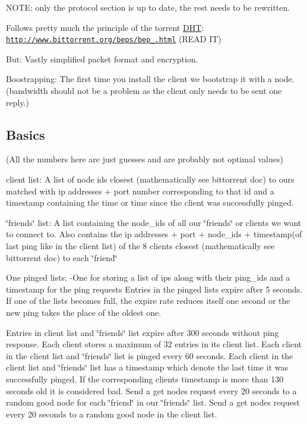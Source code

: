 N\+O\+T\+E\+: only the protocol section is up to date, the rest needs to be rewritten.

Follows pretty much the principle of the torrent \hyperlink{struct_d_h_t}{D\+H\+T}\+: \href{http://www.bittorrent.org/beps/bep_0005.html}{\tt http\+://www.\+bittorrent.\+org/beps/bep\+\_.\+html} (R\+E\+A\+D I\+T)

But\+: Vastly simplified packet format and encryption.

Boostrapping\+: The first time you install the client we bootstrap it with a node. (bandwidth should not be a problem as the client only needs to be sent one reply.)

\subsection*{Basics }

(All the numbers here are just guesses and are probably not optimal values)

client list\+: A list of node ids closest (mathematically see bittorrent doc) to ours matched with ip addresses + port number corresponding to that id and a timestamp containing the time or time since the client was successfully pinged.

\char`\"{}friends\char`\"{} list\+: A list containing the node\+\_\+ids of all our \char`\"{}friends\char`\"{} or clients we want to connect to. Also contains the ip addresses + port + node\+\_\+ids + timestamp(of last ping like in the client list) of the 8 clients closest (mathematically see bittorrent doc) to each \char`\"{}friend\char`\"{}

One pinged lists\+: -\/\+One for storing a list of ips along with their ping\+\_\+ids and a timestamp for the ping requests Entries in the pinged lists expire after 5 seconds. If one of the lists becomes full, the expire rate reduces itself one second or the new ping takes the place of the oldest one.

Entries in client list and \char`\"{}friends\char`\"{} list expire after 300 seconds without ping response. Each client stores a maximum of 32 entries in its client list. Each client in the client list and \char`\"{}friends\char`\"{} list is pinged every 60 seconds. Each client in the client list and \char`\"{}friends\char`\"{} list has a timestamp which denote the last time it was successfully pinged. If the corresponding clients timestamp is more than 130 seconds old it is considered bad. Send a get nodes request every 20 seconds to a random good node for each \char`\"{}friend\char`\"{} in our \char`\"{}friends\char`\"{} list. Send a get nodes request every 20 seconds to a random good node in the client list.

